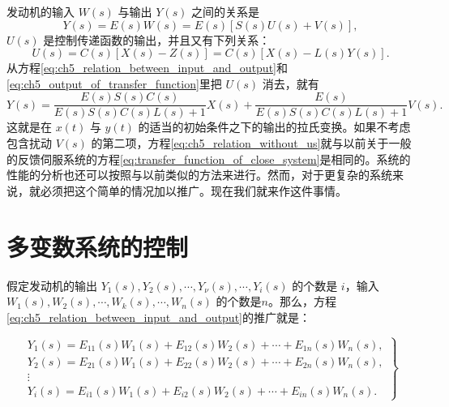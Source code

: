 发动机的输入 $W(s)$ 与输出 $Y(s)$ 之间的关系是
\begin{equation}\label{eq:ch5_relation_between_input_and_output}
Y(s) = E(s)W(s) = E(s)[S(s)U(s) + V(s)], 
\end{equation}
$U(s)$ 是控制传递函数的输出，并且又有下列关系：
\begin{equation}\label{eq:ch5_output_of_transfer_function}
U(s) = C(s)[X(s) - Z(s)] = C(s)[X(s) - L(s)Y(s)]. 
\end{equation}
从方程\eqref{eq:ch5_relation_between_input_and_output}和\eqref{eq:ch5_output_of_transfer_function}里把 $U(s)$ 消去，就有
\begin{equation}\label{eq:ch5_relation_without_us}
Y(s) = \frac{E(s)S(s)C(s)}{E(s)S(s)C(s)L(s) + 1}X(s) + \frac{E(s)}{E(s)S(s)C(s)L(s) + 1}V(s). 
\end{equation}
这就是在 $x(t)$ 与 $y(t)$ 的适当的初始条件之下的输出的拉氏变换。如果不考虑包含扰动 $V(s)$ 的第二项，方程\eqref{eq:ch5_relation_without_us}就与以前关于一般的反馈伺服系统的方程\eqref{eq:transfer_function_of_close_system}是相同的。系统的性能的分析也还可以按照与以前类似的方法来进行。然而，对于更复杂的系统来说，就必须把这个简单的情况加以推广。现在我们就来作这件事情。

\section{多变数系统的控制}

假定发动机的输出 $Y_1(s), Y_2(s), \cdots, Y_\nu(s), \cdots, Y_i(s)$ 的个数是 $i$，输入 $W_1(s), \allowbreak W_2(s), \cdots, W_k(s), \cdots, W_n(s)$ 的个数是$n$。那么，方程\eqref{eq:ch5_relation_between_input_and_output}的推广就是：

\begin{equation}\label{eq:ch5_generalization_of_equation5_1}
\left.
\begin{array}{l}
Y_1(s) = E_{11}(s)W_1(s) + E_{12}(s)W_2(s) + \cdots + E_{1n}(s)W_n(s), \\
Y_2(s) = E_{21}(s)W_1(s) + E_{22}(s)W_2(s) + \cdots + E_{2n}(s)W_n(s), \\
\vdots \\
Y_i(s) = E_{i1}(s)W_1(s) + E_{i2}(s)W_2(s) + \cdots + E_{in}(s)W_n(s).
\end{array}
\right\}
\end{equation}


